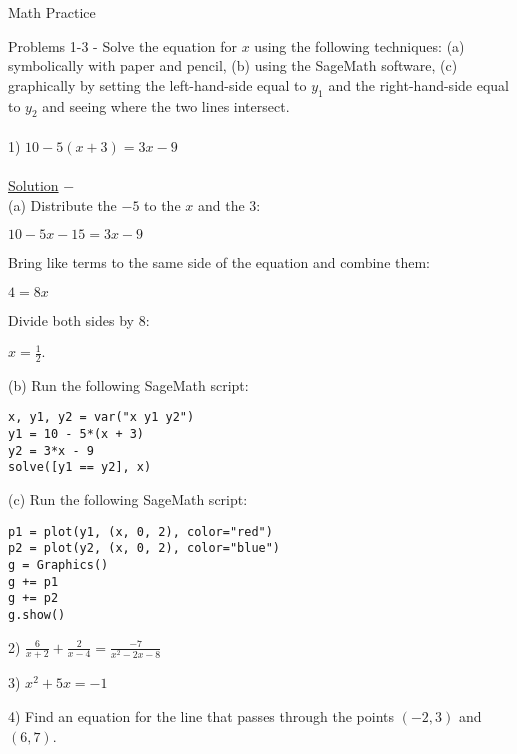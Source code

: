 \documentclass[12pt]{article}
\begin{document}
{\centering
\large Math Practice \par
}
\hfill \break

Problems 1-3 - Solve the equation for $x$ using the following techniques:
(a) symbolically with paper and pencil,
(b) using the SageMath software,
(c) graphically by setting the left-hand-side equal to $y_1$ and the right-hand-side equal to $y_2$ and seeing where the two lines intersect. \\ \\
1) $10 - 5(x+3) = 3x - 9$ \\ \\
\underline{Solution} $-$ \\
(a) Distribute the $-5$ to the $x$ and the $3$:
\begin{center}
$10 - 5x - 15 = 3x - 9$
\end{center}
Bring like terms to the same side of the equation and combine them:
\begin{center}
$4 = 8x$
\end{center}
Divide both sides by $8$:
\begin{center}
$x = \frac{1}{2}.$
\end{center}
(b) Run the following SageMath script:
\begin{verbatim}
x, y1, y2 = var("x y1 y2")
y1 = 10 - 5*(x + 3)
y2 = 3*x - 9
solve([y1 == y2], x)
\end{verbatim}
(c) Run the following SageMath script:
\begin{verbatim}
p1 = plot(y1, (x, 0, 2), color="red")
p2 = plot(y2, (x, 0, 2), color="blue")
g = Graphics()
g += p1
g += p2
g.show()
\end{verbatim}

\pagebreak

2) $\frac{6}{x+2} + \frac{2}{x-4} = \frac{-7}{x^2 - 2x - 8}$

\pagebreak

3) $x^2 + 5x = -1$

\pagebreak

4) Find an equation for the line that passes through the points $(-2, 3)$ and $(6, 7)$.
\end{document}
